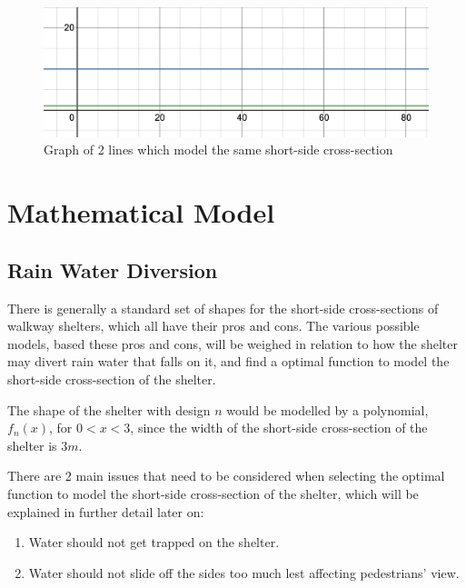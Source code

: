 \documentclass[a4paper,titlepage]{article}
\begin{document}
\begin{figure}[htbp]
    \centering
    \includegraphics[width=\textwidth]{shortSidePosition.png}
    \caption{Graph of 2 lines which model the same short-side cross-section}
    \label{fig:shortSidePosition}
\end{figure}

\pagebreak
\section{Mathematical Model}\label{sec:Mathematical Model}

\subsection{Rain Water Diversion}\label{sec:Mathematical Model:Rain Water Diversion}

There is generally a standard set of shapes for the short-side cross-sections of walkway shelters, which all have their pros and cons. The various possible models, based these pros and cons, will be weighed in relation to how the shelter may divert rain water that falls on it, and find a optimal function to model the short-side cross-section of the shelter.

The shape of the shelter with design $n$ would be modelled by a polynomial, $f_n(x)$, for $0<x<3$, since the width of the short-side cross-section of the shelter is $3\si{m}$.



There are 2 main issues that need to be considered when selecting the optimal function to model the short-side cross-section of the shelter, which will be explained in further detail later on:

\begin{enumerate}
    \item Water should not get trapped on the shelter.
    \item Water should not slide off the sides too much lest affecting pedestrians' view.
\end{enumerate}
\end{document}
